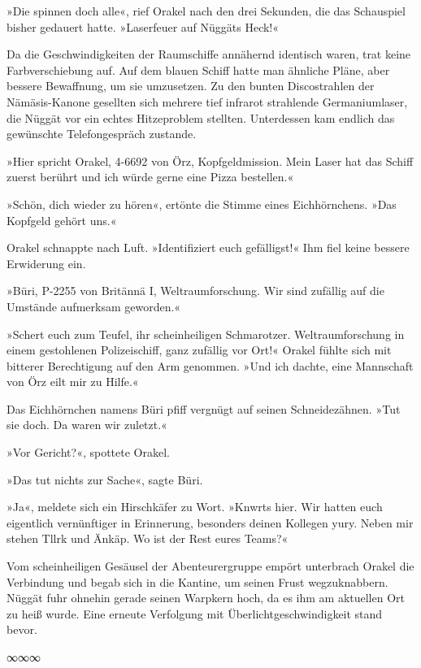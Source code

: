 »Die spinnen doch alle«, rief Orakel nach den drei Sekunden, die das Schauspiel bisher gedauert hatte. »Laserfeuer auf Nüggäts Heck!«

Da die Geschwindigkeiten der Raumschiffe annähernd identisch waren, trat keine Farbverschiebung auf. Auf dem blauen Schiff hatte man ähnliche Pläne, aber bessere Bewaffnung, um sie umzusetzen. Zu den bunten Discostrahlen der Nämäsis-Kanone gesellten sich mehrere tief infrarot strahlende Germaniumlaser, die Nüggät vor ein echtes Hitzeproblem stellten. Unterdessen kam endlich das gewünschte Telefongespräch zustande.

»Hier spricht Orakel, 4-6692 von Örz, Kopfgeldmission. Mein Laser hat das Schiff zuerst berührt und ich würde gerne eine Pizza bestellen.«

»Schön, dich wieder zu hören«, ertönte die Stimme eines Eichhörnchens. »Das Kopfgeld gehört uns.«

Orakel schnappte nach Luft. »Identifiziert euch gefälligst!« Ihm fiel keine bessere Erwiderung ein.

»Büri, P-2255 von Britännä I, Weltraumforschung. Wir sind zufällig auf die Umstände aufmerksam geworden.«

»Schert euch zum Teufel, ihr scheinheiligen Schmarotzer. Weltraumforschung in einem gestohlenen Polizeischiff, ganz zufällig vor Ort!« Orakel fühlte sich mit bitterer Berechtigung auf den Arm genommen. »Und ich dachte, eine Mannschaft von Örz eilt mir zu Hilfe.«

Das Eichhörnchen namens Büri pfiff vergnügt auf seinen Schneidezähnen. »Tut sie doch. Da waren wir zuletzt.«

»Vor Gericht?«, spottete Orakel.

»Das tut nichts zur Sache«, sagte Büri.

»Ja«, meldete sich ein Hirschkäfer zu Wort. »Knwrts hier. Wir hatten euch eigentlich vernünftiger in Erinnerung, besonders deinen Kollegen yury. Neben mir stehen Tllrk und Änkäp. Wo ist der Rest eures Teams?«

Vom scheinheiligen Gesäusel der Abenteurergruppe empört unterbrach Orakel die Verbindung und begab sich in die Kantine, um seinen Frust wegzuknabbern. Nüggät fuhr ohnehin gerade seinen Warpkern hoch, da es ihm am aktuellen Ort zu heiß wurde. Eine erneute Verfolgung mit Überlichtgeschwindigkeit stand bevor.

\begin{center}
∞∞∞
\end{center}

